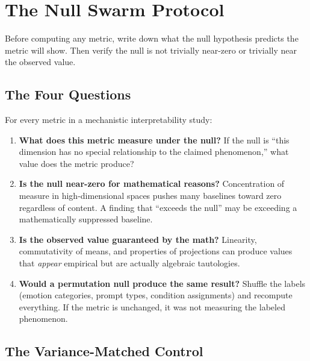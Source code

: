 \documentclass[11pt,a4paper]{article}
\begin{document}
\section{The Null Swarm Protocol}
\label{sec:protocol}

Before computing any metric, write down what the null hypothesis
predicts the metric will show. Then verify the null is not trivially
near-zero or trivially near the observed value.

\subsection{The Four Questions}

For every metric in a mechanistic interpretability study:

\begin{enumerate}[nosep]
    \item \textbf{What does this metric measure under the null?} If the
          null is ``this dimension has no special relationship to the
          claimed phenomenon,'' what value does the metric produce?

    \item \textbf{Is the null near-zero for mathematical reasons?}
          Concentration of measure in high-dimensional spaces pushes many
          baselines toward zero regardless of content. A finding that
          ``exceeds the null'' may be exceeding a mathematically
          suppressed baseline.

    \item \textbf{Is the observed value guaranteed by the math?}
          Linearity, commutativity of means, and properties of
          projections can produce values that \emph{appear} empirical but
          are actually algebraic tautologies.

    \item \textbf{Would a permutation null produce the same result?}
          Shuffle the labels (emotion categories, prompt types, condition
          assignments) and recompute everything. If the metric is
          unchanged, it was not measuring the labeled phenomenon.
\end{enumerate}

\subsection{The Variance-Matched Control}
\end{document}
